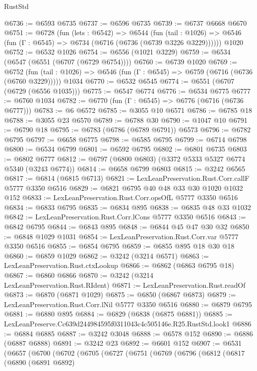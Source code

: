 \begin{lexlean}{RustStd}
\begin{coremodule}
@6736 := @6593 @6735
@6737 := @6596 @6735
@6739 := @6737 @6668 @6670
@6751 := @6728
    (fun (lets : @6542) =>
    @6544
      (fun (tail : @1026) => @6546 (fun (Γ : @6545) => @6734 (@6716 (@6736 (@6739 @3226 @3229))))))
    @1020
@6752 := @6532 @1026
@6754 := @6556 (@1021 @3229)
@6759 := @6534 (@6547 (@6551 (@6707 (@6729 @6754))))
@6760 := @6739 @1020
@6769 := @6752
    (fun (tail : @1026) => @6546 (fun (Γ : @6545) => @6759 (@6716 (@6736 (@6760 @3229)))))
    @1034
@6770 := @6532 @6545
@6774 := @6551 (@6707 (@6729 (@6556 @1035)))
@6775 := @6547 @6774
@6776 := @6534 @6775
@6777 := @6760 @1034
@6782 := @6770 (fun (Γ : @6545) => @6776 (@6716 (@6736 @6777)))
@6783 := @6 @6572
@6785 := @3055 @10 @6571
@6786 := @6785 @18
@6788 := @3055 @23 @6570
@6789 := @6788 @30
@6790 := @1047 @10
@6791 := @6790 @18
@6795 := @6783 (@6786 (@6789 @6791)) @6573
@6796 := @6782 @6795
@6797 := @6658 @6775
@6798 := @6585 @6795
@6799 := @6714 @6798
@6800 := @6534 @6799
@6801 := @6592 @6795
@6802 := @6801 @6735
@6803 := @6802 @6777
@6812 := @6797 (@6800 @6803) (@3372 @5333 @5327 @6774 @5340 (@3243 @6774))
@6814 := @6658 @6799 @6803
@6815 := @3242 @6565
@6817 := @6814 (@6815 @6713)
@6821 := LexLeanPreservation.Rust.Corr.callF @5777 @3350 @6516
@6829 := @6821 @6795 @40 @48 @33 @30 @1020 @1032 @152
@6833 := LexLeanPreservation.Rust.Corr.opsOfL @5777 @3350 @6516
@6834 := @6833 @6795
@6835 := @6834 @895
@6838 := @6835 @48 @33 @1032
@6842 := LexLeanPreservation.Rust.Corr.lCons @5777 @3350 @6516
@6843 := @6842 @6795
@6844 := @6843 @895
@6848 := @6844 @45 @47 @30 @32
@6850 := @6848 @1029 @1031
@6854 := LexLeanPreservation.Rust.Corr.var @5777 @3350 @6516
@6855 := @6854 @6795
@6859 := @6855 @895 @18 @30 @18
@6860 := @6859 @1029
@6862 := @3242 (@3214 @6571)
@6863 := LexLeanPreservation.Rust.ctxLookup
@6866 := @6862 (@6863 @6795 @18)
@6867 := @6860 @6866
@6870 := @3242 (@3214 LexLeanPreservation.Rust.RIdent)
@6871 := LexLeanPreservation.Rust.readOf
@6873 := @6870 (@6871 @1029)
@6875 := @6850 (@6867 @6873)
@6879 := LexLeanPreservation.Rust.Corr.lNil @5777 @3350 @6516
@6880 := @6879 @6795
@6881 := @6880 @895
@6884 := @6829 (@6838 (@6875 @6881))
@6885 := LexLeanPreserve.Cc639d244984595f0311043c4c505146e.R25.RustStd.look1
@6886 := @6884 @6885
@6887 := @3242 @3048
@6888 := @6578 @152
@6890 := @6886 (@6887 @6888)
@6891 := @3242 @23
@6892 := @6601 @152
@6907 := @6531
    (@6657
      (@6700
        (@6702
          (@6705
            (@6727
              (@6751
                (@6769
                  (@6796
                    (@6812
                      (@6817
                        (@6890
                          (@6891 @6892)

\end{coremodule}
\end{lexlean}
